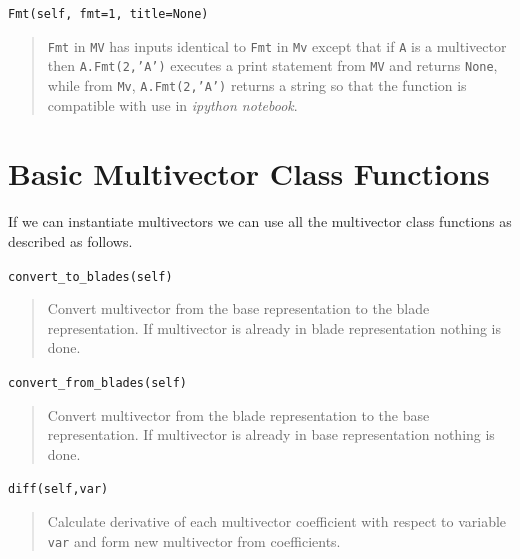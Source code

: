 \documentclass[12pt]{report}
\newcommand{\T}[1]{\texttt{#1}}
\begin{document}
\T{Fmt(self, fmt=1, title=None)}

\begin{quote}
    \T{Fmt} in \T{MV} has inputs identical to \T{Fmt} in \T{Mv} except that if \T{A} is a multivector then \T{A.Fmt(2,'A')}
    executes a print statement from \T{MV} and returns \T{None}, while from \T{Mv}, \T{A.Fmt(2,'A')} returns a string so that
    the function is compatible with use in \emph{ipython notebook}.
\end{quote}


\section{Basic Multivector Class Functions}

If we can instantiate multivectors we can use all the multivector class functions as described as follows.

\T{convert\_to\_blades(self)}
\begin{quote}
   Convert multivector from the base representation to the blade representation.
   If multivector is already in blade representation nothing is done.
\end{quote}

\T{convert\_from\_blades(self)}
\begin{quote}
   Convert multivector from the blade representation to the base representation.
   If multivector is already in base representation nothing is done.
\end{quote}

\T{diff(self,var)}
\begin{quote}
   Calculate derivative of each multivector coefficient with respect to
   variable \T{var} and form new multivector from coefficients.
\end{quote}
\end{document}
